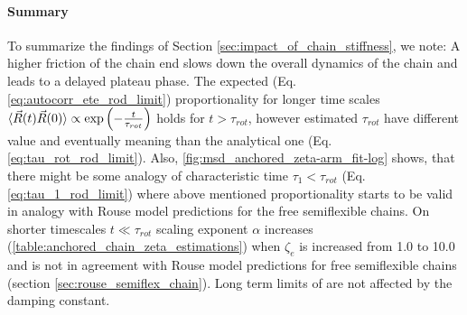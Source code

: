 \documentclass[
    paper=A4,pagesize=automedia,fontsize=12pt,
    BCOR=15mm,DIV=22,
    twoside,headinclude,footinclude=false,
    fleqn,             %
    bibliography=totocnumbered,          %
    listof=totoc,                %
    listof=flat,                 %
    cleardoublepage=empty      %
    numbers=endperiod
]{scrartcl}
\begin{document}
\paragraph{Summary}
To summarize the findings of Section \ref{sec:impact_of_chain_stiffness}, we note:
A higher friction of the chain end slows down the overall dynamics of the chain and leads
to a delayed plateau phase. The expected (Eq. \ref{eq:autocorr_ete_rod_limit}) 
proportionality for longer time scales
$\langle\vec{R}(t)\vec{R}(0)\rangle \propto \exp\left(-\frac{t}{\tau_{rot}}\right)$
holds for $t > \tau_{rot}$, however estimated $\tau_{rot}$ have different value and
eventually meaning than the analytical one (Eq. \ref{eq:tau_rot_rod_limit}).
Also, \autoref{fig:msd_anchored_zeta-arm_fit-log} shows, that there might be 
some analogy of characteristic time $\tau_1 < \tau_{rot}$ (Eq. \ref{eq:tau_1_rod_limit})
where above mentioned proportionality starts to be valid in analogy with Rouse model
predictions for the free semiflexible chains. On shorter timescales $t \ll \tau_{rot}$
scaling exponent $\alpha$ increases (\autoref{table:anchored_chain_zeta_estimations})
when $\zeta_e$ is increased from 1.0 to 10.0 and is not in agreement with 
Rouse model predictions for free semiflexible chains (section \ref{sec:rouse_semiflex_chain}).
Long term limits of are not affected by the damping constant.

\FloatBarrier
\end{document}
